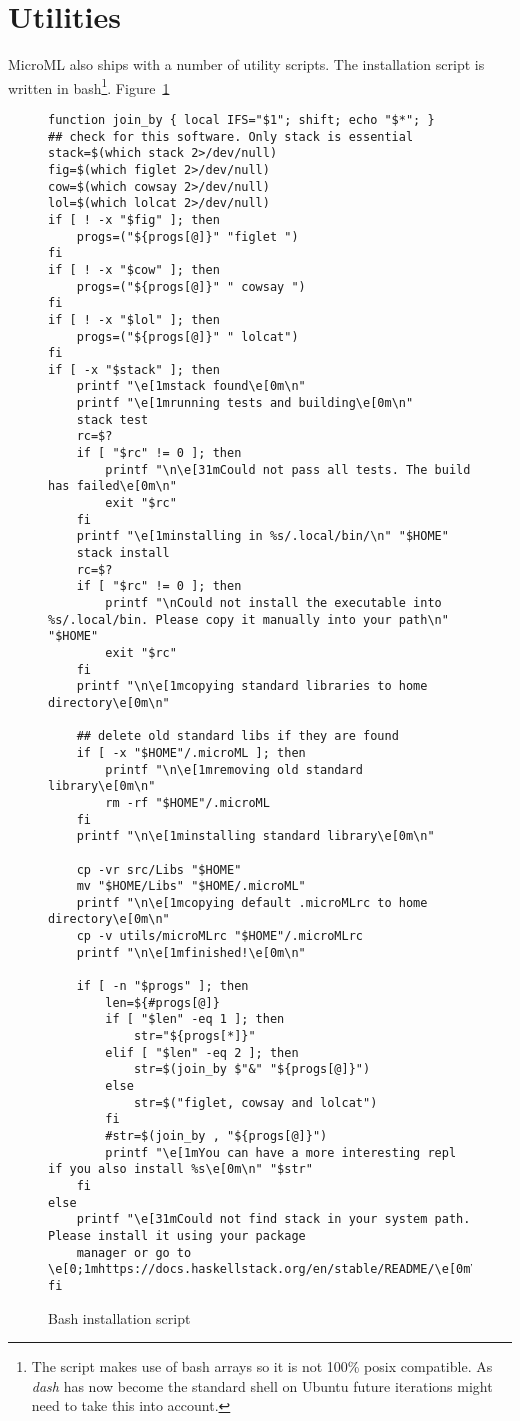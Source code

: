 \section{Utilities}
MicroML also ships with a number of utility scripts.
The installation script is written in bash\footnote{The script makes use of bash arrays so it is not
100\% posix compatible. As \textit{dash} has now become the standard shell on Ubuntu future
iterations might need to take this into account.}. Figure~\ref{fig:installation}
\begin{figure}
    \begin{verbatim}
function join_by { local IFS="$1"; shift; echo "$*"; }
## check for this software. Only stack is essential
stack=$(which stack 2>/dev/null) 
fig=$(which figlet 2>/dev/null)
cow=$(which cowsay 2>/dev/null)
lol=$(which lolcat 2>/dev/null)
if [ ! -x "$fig" ]; then
    progs=("${progs[@]}" "figlet ")
fi
if [ ! -x "$cow" ]; then
    progs=("${progs[@]}" " cowsay ")
fi
if [ ! -x "$lol" ]; then
    progs=("${progs[@]}" " lolcat")
fi
if [ -x "$stack" ]; then
    printf "\e[1mstack found\e[0m\n"
    printf "\e[1mrunning tests and building\e[0m\n"
    stack test 
    rc=$?
    if [ "$rc" != 0 ]; then
        printf "\n\e[31mCould not pass all tests. The build has failed\e[0m\n"
        exit "$rc" 
    fi
    printf "\e[1minstalling in %s/.local/bin/\n" "$HOME"
    stack install
    rc=$?
    if [ "$rc" != 0 ]; then
        printf "\nCould not install the executable into %s/.local/bin. Please copy it manually into your path\n" "$HOME"
        exit "$rc"
    fi
    printf "\n\e[1mcopying standard libraries to home directory\e[0m\n"

    ## delete old standard libs if they are found
    if [ -x "$HOME"/.microML ]; then
        printf "\n\e[1mremoving old standard library\e[0m\n"
        rm -rf "$HOME"/.microML
    fi
    printf "\n\e[1minstalling standard library\e[0m\n"

    cp -vr src/Libs "$HOME"
    mv "$HOME/Libs" "$HOME/.microML"
    printf "\n\e[1mcopying default .microMLrc to home directory\e[0m\n"
    cp -v utils/microMLrc "$HOME"/.microMLrc
    printf "\n\e[1mfinished!\e[0m\n"

    if [ -n "$progs" ]; then
        len=${#progs[@]}
        if [ "$len" -eq 1 ]; then
            str="${progs[*]}"
        elif [ "$len" -eq 2 ]; then
            str=$(join_by $"&" "${progs[@]}")
        else 
            str=$("figlet, cowsay and lolcat")
        fi
        #str=$(join_by , "${progs[@]}")
        printf "\e[1mYou can have a more interesting repl if you also install %s\e[0m\n" "$str"
    fi
else 
    printf "\e[31mCould not find stack in your system path. Please install it using your package
    manager or go to \e[0;1mhttps://docs.haskellstack.org/en/stable/README/\e[0m\n"
fi
    \end{verbatim}
    \caption{Bash installation script}
\label{fig:installation}
\end{figure}
